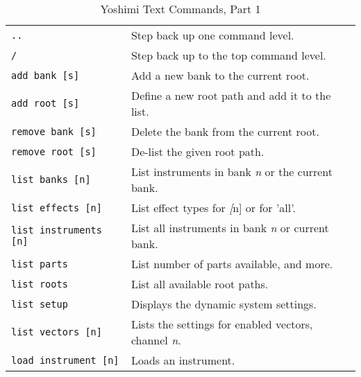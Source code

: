    \begin{table}[H]
      \centering
      \caption{Yoshimi Text Commands, Part 1}
      \label{table:yoshimi_text_commands_part_1}
      \begin{tabular}{l l}

         \texttt{..} &
            Step back up one command level. \\

         \texttt{/} &
            Step back up to the top command level. \\

         \texttt{add bank [s]} &
            Add a new bank to the current root. \\

         \texttt{add root [s]} &
            Define a new root path and add it to the list. \\

         \texttt{remove bank [s]} &
            Delete the bank from the current root. \\

         \texttt{remove root [s]} &
            De-list the given root path. \\

         \texttt{list banks [n]} &
            List instruments in bank \textsl{n} or the current bank. \\

         \texttt{list effects [n]} &
            List effect types for \textsl[n] or for 'all'.  \\

         \texttt{list instruments [n]} &
            List all instruments in bank \textsl{n} or current bank. \\

         \texttt{list parts} &
            List number of parts available, and more. \\

         \texttt{list roots} &
            List all available root paths. \\

         \texttt{list setup} &
            Displays the dynamic system settings. \\

         \texttt{list vectors [n]} &
            Lists the settings for enabled vectors, channel \textsl{n}. \\

         \texttt{load instrument [n]} &
            Loads an instrument. \\


\end{tabular}
\end{table}
